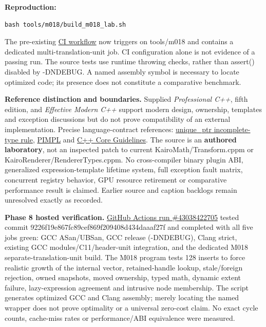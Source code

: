 \textbf{Reproduction:}

\begin{verbatim}
bash tools/m018/build_m018_lab.sh
\end{verbatim}

The pre-existing \hyperref[source-file-3b1d957d4b185d11d5c207e1]{CI workflow} now triggers on tools/m018 and contains a dedicated multi-translation-unit job. CI configuration alone is not evidence of a passing run. The source tests use runtime throwing checks, rather than assert() disabled by -DNDEBUG. A named assembly symbol is necessary to locate optimized code; its presence does not constitute a comparative benchmark.

\textbf{Reference distinction and boundaries.} Supplied \emph{Professional C++}, fifth edition, and \emph{Effective Modern C++} support modern design, ownership, templates and exception discussions but do not prove compatibility of an external implementation. Precise language-contract references: \href{https://en.cppreference.com/w/cpp/memory/unique_ptr}{unique\_ptr incomplete-type rule}, \href{https://en.cppreference.com/w/cpp/language/pimpl}{PIMPL} and \href{https://isocpp.github.io/CppCoreGuidelines/CppCoreGuidelines}{C++ Core Guidelines}. The source is an \textbf{authored laboratory}, not an inspected patch to current KairoMath/Transform.cppm or KairoRenderer/RendererTypes.cppm. No cross-compiler binary plugin ABI, generalized expression-template lifetime system, full exception fault matrix, concurrent registry behavior, GPU resource retirement or comparative performance result is claimed. Earlier source and caption backlogs remain unresolved exactly as recorded.

\textbf{Phase 8 hosted verification.} \href{https://github.com/swayam8624/Project_008_AllMight/actions/runs/43038422705}{GitHub Actions run \#43038422705} tested commit 9226f19e867fc89cef869f209408d434daaaf27f and completed with all five jobs green: GCC ASan/UBSan, GCC release (-DNDEBUG), Clang strict, existing GCC modules/C11/header-unit integration, and the dedicated M018 separate-translation-unit build. The M018 program tests 128 inserts to force realistic growth of the internal vector, retained-handle lookup, stale/foreign rejection, owned snapshots, moved ownership, typed math, dynamic extent failure, lazy-expression agreement and intrusive node membership. The script generates optimized GCC and Clang assembly; merely locating the named wrapper does not prove optimality or a universal zero-cost claim. No exact cycle counts, cache-miss rates or performance/ABI equivalence were measured.

